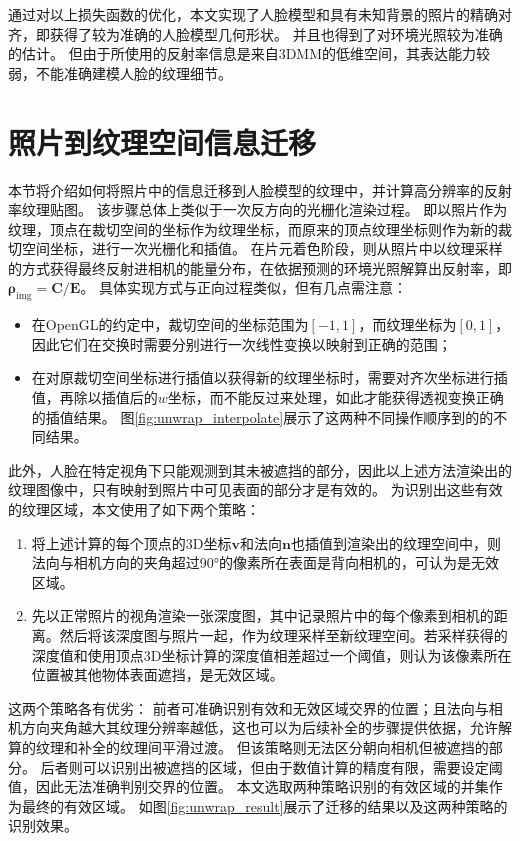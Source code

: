 
通过对以上损失函数的优化，本文实现了人脸模型和具有未知背景的照片的精确对齐，即获得了较为准确的人脸模型几何形状。
并且也得到了对环境光照较为准确的估计。
但由于所使用的反射率信息是来自3DMM的低维空间，其表达能力较弱，不能准确建模人脸的纹理细节。

\section{照片到纹理空间信息迁移}
\label{sec:method_photo2tex}

本节将介绍如何将照片中的信息迁移到人脸模型的纹理中，并计算高分辨率的反射率纹理贴图。
该步骤总体上类似于一次反方向的光栅化渲染过程。
即以照片作为纹理，顶点在裁切空间的坐标作为纹理坐标，而原来的顶点纹理坐标则作为新的裁切空间坐标，进行一次光栅化和插值。
在片元着色阶段，则从照片中以纹理采样的方式获得最终反射进相机的能量分布，在依据预测的环境光照解算出反射率，即$\mathbf{\rho}_\mathrm{img} = \mathbf{C} / \mathbf{E}$。
具体实现方式与正向过程类似，但有几点需注意：
\begin{itemize}
\item 在OpenGL的约定中，裁切空间的坐标范围为$[-1,1]$，而纹理坐标为$[0,1]$，因此它们在交换时需要分别进行一次线性变换以映射到正确的范围；
\item 在对原裁切空间坐标进行插值以获得新的纹理坐标时，需要对齐次坐标进行插值，再除以插值后的$w$坐标，而不能反过来处理，如此才能获得透视变换正确的插值结果。
图\ref{fig:unwrap_interpolate}展示了这两种不同操作顺序到的的不同结果。
\end{itemize}

此外，人脸在特定视角下只能观测到其未被遮挡的部分，因此以上述方法渲染出的纹理图像中，只有映射到照片中可见表面的部分才是有效的。
为识别出这些有效的纹理区域，本文使用了如下两个策略：
\begin{enumerate}
\item 将上述计算的每个顶点的3D坐标$\mathbf{v}$和法向$\mathbf{n}$也插值到渲染出的纹理空间中，则法向与相机方向的夹角超过90°的像素所在表面是背向相机的，可认为是无效区域。
\item 先以正常照片的视角渲染一张深度图，其中记录照片中的每个像素到相机的距离。然后将该深度图与照片一起，作为纹理采样至新纹理空间。若采样获得的深度值和使用顶点3D坐标计算的深度值相差超过一个阈值，则认为该像素所在位置被其他物体表面遮挡，是无效区域。
\end{enumerate}
这两个策略各有优劣：
前者可准确识别有效和无效区域交界的位置；且法向与相机方向夹角越大其纹理分辨率越低，这也可以为后续补全的步骤提供依据，允许解算的纹理和补全的纹理间平滑过渡。
但该策略则无法区分朝向相机但被遮挡的部分。
后者则可以识别出被遮挡的区域，但由于数值计算的精度有限，需要设定阈值，因此无法准确判别交界的位置。
本文选取两种策略识别的有效区域的并集作为最终的有效区域。
如图\ref{fig:unwrap_result}展示了迁移的结果以及这两种策略的识别效果。

